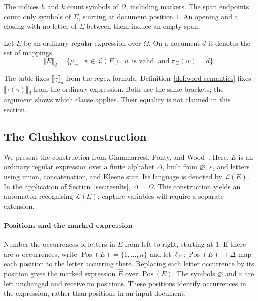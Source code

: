 The indices $h$ and $k$ count symbols of $\Omega$, including markers.
The span endpoints count only symbols of $\Sigma$, starting at document
position $1$. An opening and a closing with no letter of $\Sigma$
between them induce an empty span.

\begin{definition}
\label{def:word-semantics}
Let $E$ be an ordinary regular expression over $\Omega$. On a document
$d$ it denotes the set of mappings
\[
  \llbracket E\rrbracket_d
  =\{\mu_w\mid w\in\mathcal L(E),\ 
     w\text{ is valid, and }\pi_{\Sigma}(w)=d\}.
\]
\end{definition}

The table fixes $\llbracket\gamma\rrbracket_d$ from the regex formula.
Definition~\ref{def:word-semantics} fixes $\llbracket\tau(\gamma)\rrbracket_d$
from the ordinary expression. Both use the same brackets; the argument
shows which clause applies. Their equality is not claimed in this
section.


\subsection{The Glushkov construction}\label{subsec:glushkov}

We present the construction from
Giammarresi, Ponty, and Wood~\cite[Section~3.2]{GiammarresiPW98}.
Here, $E$ is an ordinary regular expression over a finite alphabet
$\Delta$, built from $\varnothing$, $\varepsilon$, and letters using
union, concatenation, and Kleene star. Its language is denoted by
$\mathcal L(E)$. In the application of Section~\ref{sec:results},
$\Delta=\Omega$.
This construction yields an automaton recognising $\mathcal L(E)$;
capture variables will require a separate extension.

\paragraph{Positions and the marked expression}
Number the occurrences of letters in $E$ from left to right, starting at
$1$. If there are $n$ occurrences, write
$\operatorname{Pos}(E)=\{1,\ldots,n\}$ and let
$\ell_E:\operatorname{Pos}(E)\to\Delta$ map each position to the letter
occurring there. Replacing each letter occurrence by its position gives
the marked expression $\widehat{E}$ over $\operatorname{Pos}(E)$. The symbols
$\varnothing$ and $\varepsilon$ are left unchanged and receive no positions.
These positions identify occurrences in the expression, rather than
positions in an input document.

